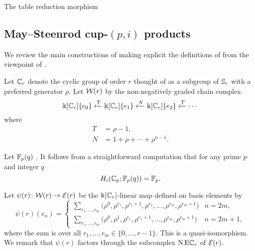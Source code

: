 \sssec

The table reduction morphism \TBW

\subsection{May--Steenrod cup-$(p,i)$ products}

We review the main constructions of \cite{medina2021may_st} making explicit the definitions of \cite{steenrod1953cyclic} from the viewpoint of \cite{may1970general}.

\sssec

Let $\mathbb{C}_r$ denote the cyclic group of order $r$ thought of as a subgroup of $\mathbb{S}_r$ with a preferred generator $\rho$.
Let $\mathcal{W}(r)$ by the non-negatively graded chain complex
\begin{equation} \label{eq: minimal resolution}
	\Bbbk[\mathbb{C}_r]\{e_0\} \xleftarrow{T} \Bbbk[\mathbb{C}_r]\{e_1\} \xleftarrow{N} \Bbbk[\mathbb{C}_r]\{e_2\} \xleftarrow{T} \cdots
\end{equation}
where
\begin{equation} \label{eq: T and R definition}
	\begin{split}
		T &= \rho - 1, \\
		N &= 1 + \rho + \cdots + \rho^{n-1}.
	\end{split}
\end{equation}

\sssec

Let ${\mathbb{F}_p}(q)$ \TBW.
It follows from a straightforward computation that for any prime $p$ and integer $q$
\begin{equation*}
	H_i(\mathbb{C}_p; \mathbb{F}_p(q)) = \mathbb{F}_p.
\end{equation*}

\sssec

Let $\psi(r) \colon \mathcal{W}(r) \to \mathcal{E}(r)$ be the $\Bbbk[\mathbb{C}_r]$-linear map defined on basis elements by
\begin{equation*}
	\psi(r)(e_{n}) = \begin{cases}
		\displaystyle{\sum_{r_1, \dots, r_m}} \big(\rho^0, \rho^{r_1}, \rho^{r_1+1}, \rho^{r_2}, \dots, \rho^{r_{m}}, \rho^{r_{m}+1} \big) & n = 2m, \\
		\displaystyle{\sum_{r_1, \dots, r_m}} \big(\rho^0, \rho^1, \rho^{r_1}, \rho^{r_1+1}, \dots, \rho^{r_{m}}, \rho^{r_{m}+1} \big) & n = 2m+1,
	\end{cases}
\end{equation*}
where the sum is over all $r_1, \dots, r_m \in \{0, \dots, r-1\}$.
This is a quasi-isomorphism.
We remark that $\psi(r)$ factors through the subcomplex $\operatorname{N}\mathrm{E}\mathbb{C}_r$ of $\mathcal{E}(r)$.

